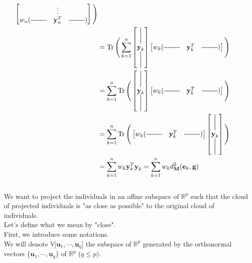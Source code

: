 \begin{notechapter}
\begin{align*}
\begin{bmatrix*}
        &\vdots&\\
        w_n(\horzbar &\textbf{y}_{n}^T& \horzbar)
    \end{bmatrix*}\Bigg)\\
    &= \Tr \Bigg(\sum_{k=1}^{n} 
    \begin{bmatrix*}
        \vertbar\\
        {\textbf{y}}_{k} \\
        \vertbar
    \end{bmatrix*}
    \begin{bmatrix*}
        w_k(\horzbar &\textbf{y}_{k}^T& \horzbar)
    \end{bmatrix*}\Bigg) \\
    &= \sum_{k=1}^{n} \Tr \Bigg(\begin{bmatrix*}
        \vertbar\\
        {\textbf{y}}_{k} \\
        \vertbar
    \end{bmatrix*}
    \begin{bmatrix*}
        w_k(\horzbar &\textbf{y}_{k}^T& \horzbar)
    \end{bmatrix*}\Bigg)  \\
    &= \sum_{k=1}^{n} \Tr \Bigg(
    \begin{bmatrix*}
        w_k(\horzbar &\textbf{y}_{k}^T& \horzbar)
    \end{bmatrix*}  
    \begin{bmatrix*}
        \vertbar\\
        {\textbf{y}}_{k} \\
        \vertbar
    \end{bmatrix*} \Bigg) \\
    &= \displaystyle\sum_{k=1}^{n} w_k \textbf{y}_k^T \textbf{y}_k = \displaystyle\sum_{k=1}^{n} w_{k} d_{\textbf{M}}^2(\textbf{e}_k,\textbf{g}) 
\end{align*}
\\[10pt]
We want to project the individuals in an affine subspace of $\mathbb{R}^{p}$ such that the cloud of projected individuals
is "as close as possible" to the original cloud of individuals.\\[6pt]
%
Let's define what we mean by "close".\\[6pt]
First, we introduce some notations. \\[6pt]
We will denote $\mathbb{V}\big[\textbf{u}_1, \cdots, \textbf{u}_{q}\big]$ the
subspace of $\mathbb{R}^{p}$ generated by the orthonormal vectors $\big\{\textbf{u}_1, \cdots, \textbf{u}_{q}\big\}$ of $\mathbb{R}^{p}$ ($q \leq p$).\\[6pt]

\end{notechapter}
